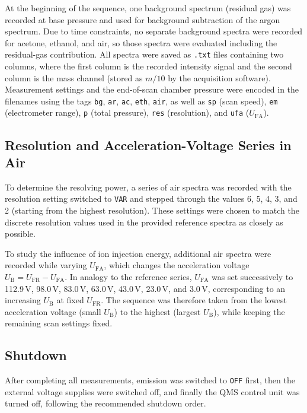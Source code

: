 \documentclass[a4paper]{article}
\begin{document}
At the beginning of the sequence, one background spectrum (residual gas) was recorded at base pressure and used for background subtraction of the argon spectrum.
Due to time constraints, no separate background spectra were recorded for acetone, ethanol, and air, so those spectra were evaluated including the residual-gas contribution.
All spectra were saved as \texttt{.txt} files containing two columns, where the first column is the recorded intensity signal and the second column is the mass channel (stored as $m/10$ by the acquisition software).
Measurement settings and the end-of-scan chamber pressure were encoded in the filenames using the tags \texttt{bg}, \texttt{ar}, \texttt{ac}, \texttt{eth}, \texttt{air}, as well as \texttt{sp} (scan speed), \texttt{em} (electrometer range), \texttt{p} (total pressure), \texttt{res} (resolution), and \texttt{ufa} ($U_{\mathrm{FA}}$).

\subsection{Resolution and Acceleration-Voltage Series in Air}

To determine the resolving power, a series of air spectra was recorded with the resolution setting switched to \texttt{VAR} and stepped through the values 6, 5, 4, 3, and 2 (starting from the highest resolution).
These settings were chosen to match the discrete resolution values used in the provided reference spectra as closely as possible.

To study the influence of ion injection energy, additional air spectra were recorded while varying $U_{\mathrm{FA}}$, which changes the acceleration voltage $U_{\mathrm{B}}=U_{\mathrm{FR}}-U_{\mathrm{FA}}$.
In analogy to the reference series, $U_{\mathrm{FA}}$ was set successively to 112.9\,V, 98.0\,V, 83.0\,V, 63.0\,V, 43.0\,V, 23.0\,V, and 3.0\,V, corresponding to an increasing $U_{\mathrm{B}}$ at fixed $U_{\mathrm{FR}}$.
The sequence was therefore taken from the lowest acceleration voltage (small $U_{\mathrm{B}}$) to the highest (largest $U_{\mathrm{B}}$), while keeping the remaining scan settings fixed.

\subsection{Shutdown}

After completing all measurements, emission was switched to \texttt{OFF} first, then the external voltage supplies were switched off, and finally the QMS control unit was turned off, following the recommended shutdown order.
\end{document}
